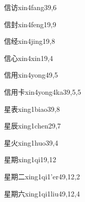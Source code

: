 \begin{entry}{信访}{xin4fang3}{9,6}
\end{entry}

\begin{entry}{信封}{xin4feng1}{9,9}
\end{entry}

\begin{entry}{信经}{xin4jing1}{9,8}
\end{entry}

\begin{entry}{信心}{xin4xin1}{9,4}
\end{entry}

\begin{entry}{信用}{xin4yong4}{9,5}
\end{entry}

\begin{entry}{信用卡}{xin4yong4ka3}{9,5,5}
\end{entry}

\begin{entry}{星表}{xing1biao3}{9,8}
\end{entry}

\begin{entry}{星辰}{xing1chen2}{9,7}
\end{entry}

\begin{entry}{星火}{xing1huo3}{9,4}
\end{entry}

\begin{entry}{星期}{xing1qi1}{9,12}
\end{entry}

\begin{entry}{星期二}{xing1qi1'er4}{9,12,2}
\end{entry}

\begin{entry}{星期六}{xing1qi1liu4}{9,12,4}
\end{entry}

